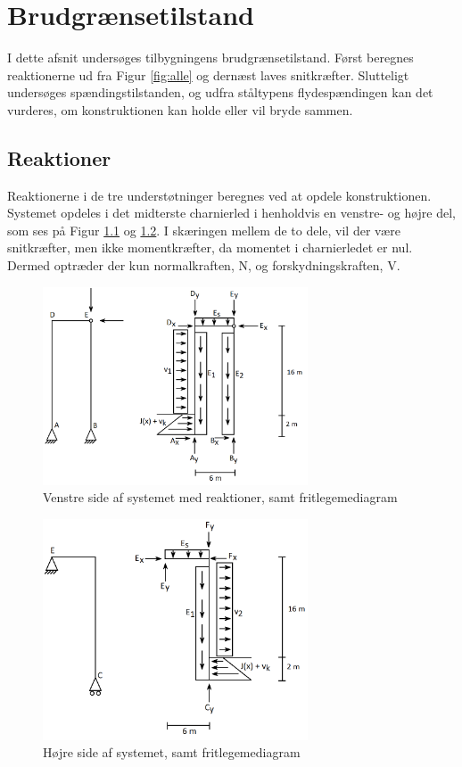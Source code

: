 \chapter{Brudgrænsetilstand}

I dette afsnit undersøges tilbygningens brudgrænsetilstand. Først beregnes reaktionerne ud fra Figur \ref{fig:alle} og dernæst laves snitkræfter. Slutteligt undersøges spændingstilstanden, og udfra ståltypens flydespændingen kan det vurderes, om konstruktionen kan holde eller vil bryde sammen.   

\section{Reaktioner}
Reaktionerne i de tre understøtninger beregnes ved at opdele konstruktionen. Systemet opdeles i det midterste charnierled i henholdvis en venstre- og højre del, som ses på Figur \ref{fig:opdelingv} og \ref{fig:opdelingh}. I skæringen mellem de to dele, vil der være snitkræfter, men ikke momentkræfter, da momentet i charnierledet er nul. Dermed optræder der kun normalkraften, N, og forskydningskraften, V.

\begin{figure}[H]
	\centering
	\includegraphics[width=0.7\textwidth]{billeder/venstre.png}
	\caption{Venstre side af systemet med reaktioner, samt fritlegemediagram}
	\label{fig:opdelingv}
\end{figure}

\begin{figure}[H]
	\centering
	\includegraphics[width=0.7\textwidth]{billeder/hojre.png}
	\caption{Højre side af systemet, samt fritlegemediagram}
	\label{fig:opdelingh}
\end{figure}

